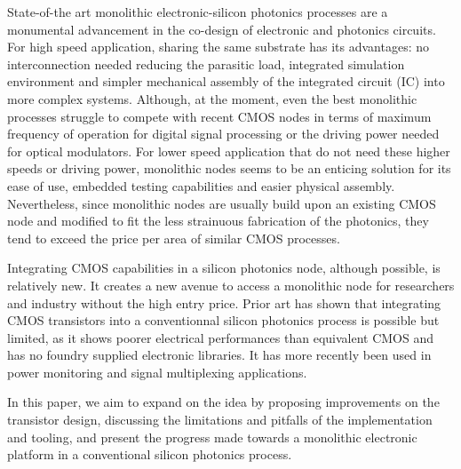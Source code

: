 State-of-the art monolithic electronic-silicon photonics processes are a monumental advancement in the co-design of electronic and photonics circuits.
For high speed application, sharing the same substrate has its advantages: no interconnection needed reducing the parasitic load, integrated simulation environment and simpler mechanical assembly of the integrated circuit (IC) into more complex systems.
Although, at the moment, even the best monolithic processes struggle to compete with recent CMOS nodes in terms of maximum frequency of operation for digital signal processing or the driving power needed for optical modulators. 
For lower speed application that do not need these higher speeds or driving power, monolithic nodes seems to be an enticing solution for its ease of use, embedded testing capabilities and easier physical assembly.
Nevertheless, since monolithic nodes are usually build upon an existing CMOS node and modified to fit the less strainuous fabrication of the photonics, they tend to exceed the price per area of similar CMOS processes\cite{shekhar_roadmapping_2024}. 

Integrating CMOS capabilities in a silicon photonics node, although possible, is relatively new. 
It creates a new avenue to access a monolithic node for researchers and industry without the high entry price.
Prior art has shown that integrating CMOS transistors into a conventionnal silicon photonics process is possible but limited\cite{zanetto_unconventional_2023,shekhar_roadmapping_2024}, as it shows poorer electrical performances than equivalent CMOS and has no foundry supplied electronic libraries.
It has more recently been used in power monitoring and signal multiplexing applications\cite{crico_monolithic_2024,zanetto_timemultiplexed_2023}.

In this paper, we aim to expand on the idea by proposing improvements on the transistor design, discussing the limitations and pitfalls of the implementation and tooling, and present the progress made towards a monolithic electronic platform in a conventional silicon photonics process.





